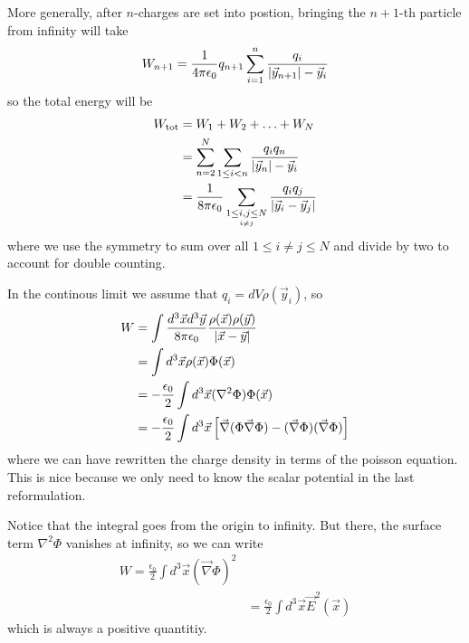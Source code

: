 More generally, after $n$-charges are set into postion, bringing the $n+1$-th particle from infinity will take
\begin{align*}
  W_{n+1} = \frac{1}{4 \pi \epsilon_0} q_{n+1} \sum_{i=1}^{n}\frac{q_i}{\vert\vec{y}_{n+1}\vert- \vec{y}_i}
\end{align*}
so the total energy will be
\begin{align*}
  W_{\text{tot}} &= W_1 + W_2 + \ldots + W_N\\
  &= \sum_{n=2}^{N}\sum_{1 \leq i < n} \frac{q_i q_n}{\vert\vec{y}_n\vert - \vec{y}_i}\\
  &= \frac{1}{8 \pi \epsilon_0} \sum_{\underset{i \neq j}{1 \leq i,j \leq N}} \frac{q_iq_j}{\vert\vec{y}_i - \vec{y}_j\vert}
\end{align*}
where we use the symmetry to sum over all $1 \leq i \neq j \leq N$ and divide by two to account for double counting.



In the continous limit we assume that $q_i = dV \rho(\vec{y}_i)$, so 
\begin{align*}
  W &= \int \frac{d^{3} \vec{x} d^{3}\vec{y}}{8 \pi \epsilon_0} \frac{\rho(\vec{x}) \rho(\vec{y})}{\vert\vec{x} - \vec{y}\vert}\\
    &= \int d^{3}\vec{x} \rho(\vec{x}) \Phi(\vec{x})\\
    &= - \frac{\epsilon_0}{2} \int d^{3} \vec{x} (\nabla^{2} \Phi) \Phi(\vec{x})\\
    &= - \frac{\epsilon_0}{2} \int d^{3} \vec{x} \left[
      \vec{\nabla}(\Phi \vec{\nabla} \Phi) - (\vec{\nabla}\Phi)(\vec{\nabla}\Phi)
    \right] 
\end{align*}
where we can have rewritten the charge density in terms of the poisson equation.
This is nice because we only need to know the scalar potential in the last reformulation.

Notice that the integral goes from the origin to infinity. But there, the surface term $\nabla^{2}\Phi$ vanishes at infinity, so we can write
\begin{align*}
  W = \frac{\epsilon_0}{2} \int d^{3}\vec{x} (\vec{\nabla}\Phi)^{2}\\
  &= \frac{\epsilon_0}{2} \int d^{3}\vec{x} \vec{E}^{2}(\vec{x})
\end{align*}
which is always a positive quantitiy.


